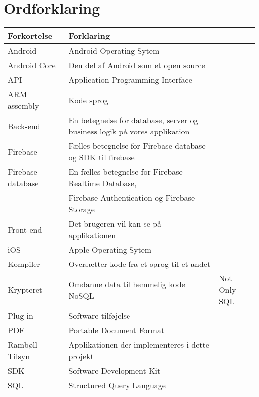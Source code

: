 \chapter*{Ordforklaring}

\begin{tabularx}{\textwidth}{l l X} \hline
	\textbf{Forkortelse}  & \textbf{Forklaring} \\ \hline
	Android& Android Operating Sytem \\
	Android Core& Den del af Android som et open source& \\
	API& Application Programming Interface \\
	ARM assembly& Kode sprog \\
	Back-end& En betegnelse for database, server og business logik på vores applikation \\
	Firebase& Fælles betegnelse for Firebase database og SDK til firebase\\
	Firebase database& En fælles betegnelse for Firebase Realtime Database,\\
	& Firebase Authentication og Firebase Storage \\
	Front-end& Det brugeren vil kan se på applikationen \\
	iOS&  Apple Operating Sytem \\
	Kompiler& Oversætter kode fra et sprog til et andet \\
	Krypteret& Omdanne data til hemmelig kode
	NoSQL & Not Only SQL \\
	Plug-in&  Software tilføjelse \\
	PDF& Portable Document Format \\
	Rambøll Tilsyn& Applikationen der implementeres i dette projekt\\
	SDK& Software Development Kit\\
	SQL&  Structured Query Language \\
	
\end{tabularx}